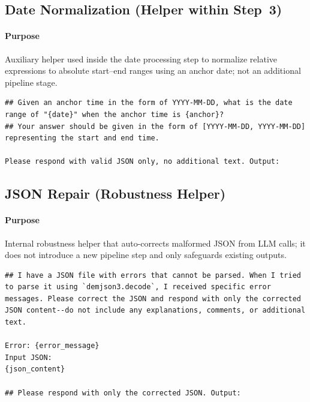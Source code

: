 \subsection{Date Normalization (Helper within Step~3)}
\paragraph{Purpose} Auxiliary helper used inside the date processing step to normalize relative expressions to absolute start–end ranges using an anchor date; not an additional pipeline stage.
\begin{lstlisting}
## Given an anchor time in the form of YYYY-MM-DD, what is the date range of "{date}" when the anchor time is {anchor}?
## Your answer should be given in the form of [YYYY-MM-DD, YYYY-MM-DD] representing the start and end time.

Please respond with valid JSON only, no additional text. Output:
\end{lstlisting}

\subsection{JSON Repair (Robustness Helper)}
\paragraph{Purpose} Internal robustness helper that auto-corrects malformed JSON from LLM calls; it does not introduce a new pipeline step and only safeguards existing outputs.
\begin{lstlisting}
## I have a JSON file with errors that cannot be parsed. When I tried to parse it using `demjson3.decode`, I received specific error messages. Please correct the JSON and respond with only the corrected JSON content--do not include any explanations, comments, or additional text.

Error: {error_message}
Input JSON:
{json_content}

## Please respond with only the corrected JSON. Output:
\end{lstlisting}
